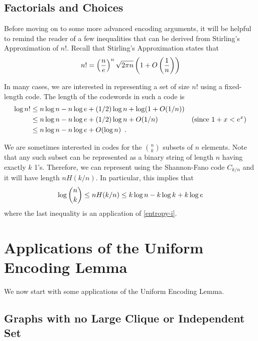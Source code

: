 \documentclass{patmorin}
\begin{document}
\subsection{Factorials and Choices}

Before moving on to some more advanced encoding arguments, it will
be helpful to remind the reader of a few inequalities that can be
derived from Stirling's Approximation of $n!$.  Recall that Stirling's
Approximation states that
\begin{equation}
  n! = \left(\frac{n}{e}\right)^n\sqrt{2\pi n}\left(1+O\left(\frac{1}{n}\right)\right) 
   \eqlabel{stirling}
\end{equation}

In many cases, we are interested in representing a set of size $n!$
using a fixed-length code.  The length of the codewords in such a code
is 
\begin{align}
  \log n!
      & \le n\log n - n\log e + (1/2)\log n + \log(1+O(1/n)) \notag \\
      & \le n\log n - n\log e + (1/2)\log n + O(1/n)  
             & \text{(since $1+x < e^x$)} \notag \\
      & \le n\log n - n\log e + O(\log n)  
             \eqlabel{stirling-loose} \enspace .
\end{align}

We are sometimes interested in codes for the $\binom{n}{k}$ subsets of $n$
elements.  Note that any such subset can be represented as a binary string of length $n$ having exactly $k$ 1's. Therefore, we can represent using the Shannon-Fano code $C_{k/n}$ and it will have length 
$nH(k/n)$.  In particular, this implies that
\begin{equation}
  \log\binom{n}{k} \le nH(k/n) \le k\log n - k\log k + k\log e 
  \eqlabel{log-n-choose-k}
\end{equation}
where the last inequality is an application of \eqref{entropy-i}.

\section{Applications of the Uniform Encoding Lemma}

We now start with some applications of the Uniform Encoding Lemma.

\subsection{Graphs with no Large Clique or Independent Set}
\end{document}
